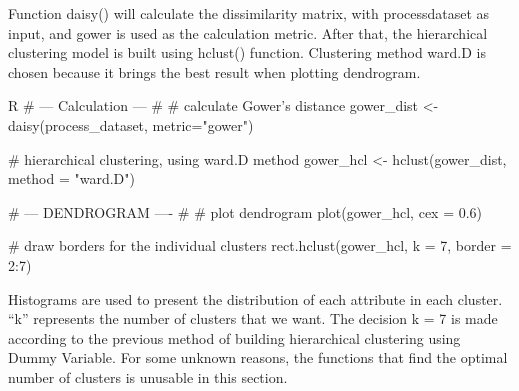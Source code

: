 Function daisy() will calculate the dissimilarity matrix, with process\textunderscore dataset as input, and gower  is used as the calculation metric. After that, the hierarchical clustering model is built using hclust() function. Clustering method ward.D is chosen because it brings the best result when plotting dendrogram.
    \begin{code}{R}
            # --- Calculation --- #
        # calculate Gower's distance
        gower_dist <- daisy(process_dataset, metric="gower")   

        # hierarchical clustering, using ward.D method 
        gower_hcl <- hclust(gower_dist, method = "ward.D")  

            # --- DENDROGRAM ---- #
        # plot dendrogram
        plot(gower_hcl, cex = 0.6)

        # draw borders for the individual clusters
        rect.hclust(gower_hcl, k = 7, border = 2:7)
    \end{code}
Histograms are used to present the distribution of each attribute in each cluster. “k” represents the number of clusters that we want. The decision k = 7 is made according to the previous method of building hierarchical clustering using Dummy Variable. For some unknown reasons, the functions that find the optimal number of clusters is unusable in this section.
